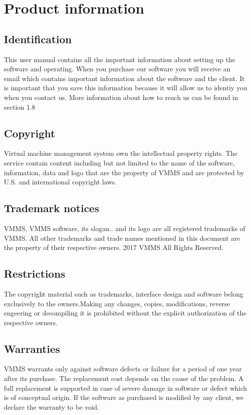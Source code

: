 \chapter{Product information}
\vspace{-6em}


\section{Identification}
This user manual contains all the important information about setting up the
software and operating. When you purchase our software you will receive an email
which contains important information about the software and the client. It is
important that you save this information because it will allow us to identiy you
when you contact us. More information about how to reach us can be found in
section 1.8

\section{Copyright}

Virtual machine management system own the intellectual property rights. The
service contain content including  but not limited to the name of the software,
information, data and logo that are the property of VMMS and are protected by
U.S. and international copyright laws.

\section{Trademark notices}

VMMS, VMMS software, its slogan.. and its logo are all registered trademarks of
VMMS. All other trademarks and trade names mentioned in this document are the
property of their respective owners. 2017 VMMS All Rights Reserved.

\section{Restrictions}
The copyright material such as trademarks, interface design and software belong
exclusively to the owners.Making any changes, copies, modifications, reverse
engeering or decompiling it is prohibited without the explicit authorization of 
the respective owners.

\section{Warranties}
VMMS warrants only against software defects or failure for a period of one year
after its purchase. The replacement cost depends on the cause of the problem. A
full replacement is supported in case of severe damage in software or defect
which is of conceptual origin. If the software as purchased is modified by any
client, we declare the warranty to be void.

